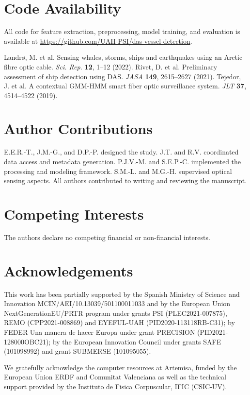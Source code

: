 \documentclass[11pt]{article}
\begin{document}
\section*{Code Availability}
All code for feature extraction, preprocessing, model training, and evaluation is available at \url{https://github.com/UAH-PSI/das-vessel-detection}.

\begin{thebibliography}{9}
 Landr\o, M. et al. Sensing whales, storms, ships and earthquakes using an Arctic fibre optic cable. \textit{Sci. Rep.} \textbf{12}, 1–12 (2022).
 Rivet, D. et al. Preliminary assessment of ship detection using DAS. \textit{JASA} \textbf{149}, 2615–2627 (2021).
 Tejedor, J. et al. A contextual GMM-HMM smart fiber optic surveillance system. \textit{JLT} \textbf{37}, 4514–4522 (2019).
\end{thebibliography}

\section*{Author Contributions}
E.E.R.-T., J.M.-G., and D.P.-P. designed the study. J.T. and R.V. coordinated data access and metadata generation. P.J.V.-M. and S.E.P.-C. implemented the processing and modeling framework. S.M.-L. and M.G.-H. supervised optical sensing aspects. All authors contributed to writing and reviewing the manuscript.

\section*{Competing Interests}
The authors declare no competing financial or non-financial interests.

\section*{Acknowledgements}

This work has been partially supported by the Spanish Ministry of Science and
Innovation MCIN/AEI/10.13039/501100011033 and by the European Union NextGenerationEU/PRTR program under grants PSI (PLEC2021-007875), REMO (CPP2021-008869) and EYEFUL-UAH (PID2020-113118RB-C31); by FEDER Una manera de hacer Europa under grant PRECISION (PID2021-128000OBC21); by the European Innovation Council under grants SAFE (101098992) and grant SUBMERSE (101095055).

We gratefully acknowledge the computer resources at Artemisa, funded by the European Union ERDF and Comunitat Valenciana as well as the technical support provided by the Instituto de Fisica Corpuscular, IFIC (CSIC-UV).
\end{document}
